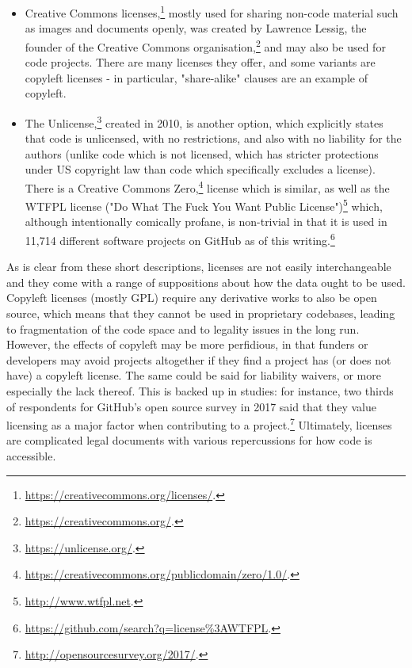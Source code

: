 \begin{itemize}
\item Creative Commons licenses,\footnote{\href{https://creativecommons.org/licenses/}{https://creativecommons.org/licenses/}. } mostly used for sharing non-code material such as images and documents openly, was created by Lawrence Lessig, the founder of the Creative Commons organisation,\footnote{\href{https://creativecommons.org/}{https://creativecommons.org/}. } and may also be used for code projects. There are many licenses they offer, and some variants are copyleft licenses - in particular, "share-alike" clauses are an example of copyleft.
\item The Unlicense,\footnote{\href{https://unlicense.org/}{https://unlicense.org/}. } created in 2010, is another option, which explicitly states that code is unlicensed, with no restrictions, and also with no liability for the authors (unlike code which is not licensed, which has stricter protections under US copyright law than code which specifically excludes a license). There is a Creative Commons Zero,\footnote{\href{https://creativecommons.org/publicdomain/zero/1.0/}{https://creativecommons.org/publicdomain/zero/1.0/}. } license which is similar, as well as the WTFPL license ("Do What The Fuck You Want Public License")\footnote{\href{http://www.wtfpl.net}{http://www.wtfpl.net}. } which, although intentionally comically profane, is non-trivial in that it is used in 11,714 different software projects on GitHub as of this writing.\footnote{\href{https://github.com/search?q=license\%3AWTFPL}{https://github.com/search?q=license\%3AWTFPL}. }
\end{itemize}

As is clear from these short descriptions, licenses are not easily interchangeable and they come with a range of suppositions about how the data ought to be used. Copyleft licenses (mostly GPL) require any derivative works to also be open source, which means that they cannot be used in proprietary codebases, leading to fragmentation of the code space and to legality issues in the long run. However, the effects of copyleft may be more perfidious, in that funders or developers may avoid projects altogether if they find a project has (or does not have) a copyleft license. The same could be said for liability waivers, or more especially the lack thereof. This is backed up in studies: for instance, two thirds of respondents for GitHub's open source survey in 2017 said that they value licensing as a major factor when contributing to a project.\footnote{\href{http://opensourcesurvey.org/2017/}{http://opensourcesurvey.org/2017/}. } Ultimately, licenses are complicated legal documents with various repercussions for how code is accessible.

